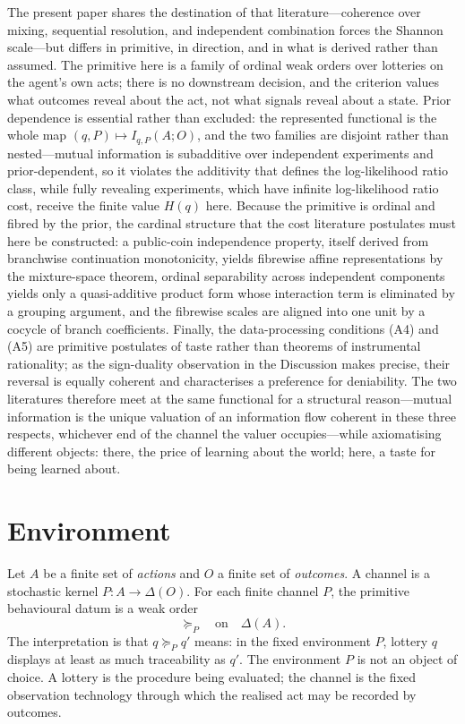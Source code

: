 \documentclass[11pt,a4paper]{article}
\theoremstyle{definition}
\newcommand{\1}{\mathbf 1}
\begin{document}
The present paper shares the destination of that literature---coherence over mixing, sequential resolution, and
independent combination forces the Shannon scale---but differs in primitive, in direction, and in what is derived
rather than assumed.  The primitive here is a family of ordinal weak orders over lotteries on the agent's own acts;
there is no downstream decision, and the criterion values what outcomes reveal about the act, not what signals reveal
about a state.  Prior dependence is essential rather than excluded: the represented functional is the whole map
$(q,P)\mapsto I_{q,P}(A;O)$, and the two families are disjoint rather than nested---mutual information is subadditive
over independent experiments and prior-dependent, so it violates the additivity that defines the log-likelihood ratio
class, while fully revealing experiments, which have infinite log-likelihood ratio cost, receive the finite value
$H(q)$ here.  Because the primitive is ordinal and fibred by the prior, the cardinal structure that the cost literature
postulates must here be constructed: a public-coin independence property, itself derived from branchwise continuation
monotonicity, yields fibrewise affine representations by the
mixture-space theorem, ordinal separability across independent components yields only a quasi-additive product form
whose interaction term is eliminated by a grouping argument, and the fibrewise scales are aligned into one unit by a
cocycle of branch coefficients.  Finally, the data-processing conditions \textup{(A4)} and \textup{(A5)} are primitive
postulates of taste rather than theorems of instrumental rationality; as the sign-duality observation in the Discussion
makes precise, their reversal is equally coherent and characterises a preference for deniability.  The two literatures
therefore meet at the same functional for a structural reason---mutual information is the unique valuation of an
information flow coherent in these three respects, whichever end of the channel the valuer occupies---while
axiomatising different objects: there, the price of learning about the world; here, a taste for being learned about.

\section*{Environment}

Let $A$ be a finite set of \emph{actions} and $O$ a finite set of \emph{outcomes}.  A channel is a stochastic kernel
$P:A\to\Delta(O)$.  For each finite channel $P$, the primitive behavioural datum is a weak order
\[
\succeq_P\quad\text{on}\quad \Delta(A).
\]
The interpretation is that $q\succeq_P q'$ means: in the fixed environment $P$, lottery $q$ displays at least as much
traceability as $q'$.
The environment $P$ is not an object of choice.  A lottery is the procedure being evaluated; the channel is the fixed
observation technology through which the realised act may be recorded by outcomes.
\end{document}
